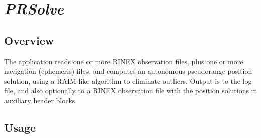%
%

\section{\emph{PRSolve}}
\subsection{Overview}
The application reads one or more RINEX observation files, plus one or more
   navigation (ephemeris) files, and computes an autonomous pseudorange
   position solution, using a RAIM-like algorithm to eliminate outliers.
   Output is to the log file, and also optionally to a RINEX observation file with
   the position solutions in auxiliary header blocks.

\subsection{Usage}
